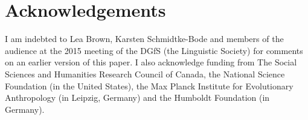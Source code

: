 \documentclass[output=paper]{langsci/langscibook}
\begin{document}
\section*{Acknowledgements}

I am indebted to Lea Brown, Karsten Schmidtke-Bode and members of the audience at the 2015 meeting of the DGfS (the  Linguistic Society) for comments on an earlier version of this paper. I also acknowledge funding from The Social Sciences and Humanities Research Council of Canada, the National Science Foundation (in the United States), the Max Planck Institute for Evolutionary Anthropology (in Leipzig, Germany) and the Humboldt Foundation (in Germany).


\sloppy
\printbibliography[heading=subbibliography,notkeyword=this] 
\end{document}
